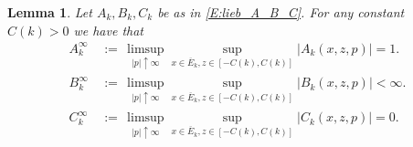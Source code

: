 \documentclass[11pt, letterpaper]{amsart}
\newtheorem{lemma}[theorem]{Lemma}
\theoremstyle{definition}
\theoremstyle{remark}
\numberwithin{equation}{section}
\newcommand{\dfn}{\, := \,}
\newcommand{\ol}[1]{\overline{#1}}
\begin{document}


\begin{lemma}\label{L:lieb_A_B_C}
Let $A_k,B_k,C_k$ be as in \eqref{E:lieb_A_B_C}.  For any constant $C(k)>0$ we have that
\begin{equation}\label{E:lieb_A_B_C_inf}
\begin{split}
A^\infty_k &\dfn \limsup_{|p|\uparrow\infty}\sup_{x\in\ol{E}_k, z\in[-C(k),C(k)]} |A_k(x,z,p)| = 1.\\
B^\infty_k &\dfn \limsup_{|p|\uparrow\infty}\sup_{x\in\ol{E}_k, z\in[-C(k),C(k)]} |B_k(x,z,p)| < \infty.\\
C^\infty_k &\dfn \limsup_{|p|\uparrow\infty}\sup_{x\in\ol{E}_k, z\in[-C(k),C(k)]} |C_k(x,z,p)| = 0.
\end{split}
\end{equation}
\end{lemma}
\end{document}
